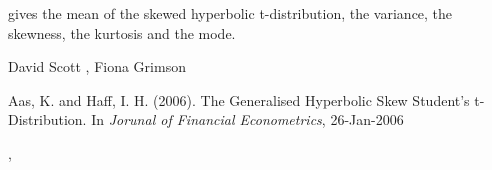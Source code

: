 \begin{Value}
 gives the mean of the skewed hyperbolic
t-distribution,  the variance,  the
skewness,  the kurtosis and  the
mode.
\end{Value}
\begin{Author}\relax
David Scott , Fiona Grimson
\end{Author}
\begin{References}\relax
Aas, K. and Haff, I. H. (2006).
The Generalised Hyperbolic Skew Student's t-Distribution.
In \emph{Jorunal of Financial Econometrics}, 26-Jan-2006
\end{References}
\begin{SeeAlso}\relax
{}, 
\end{SeeAlso}

